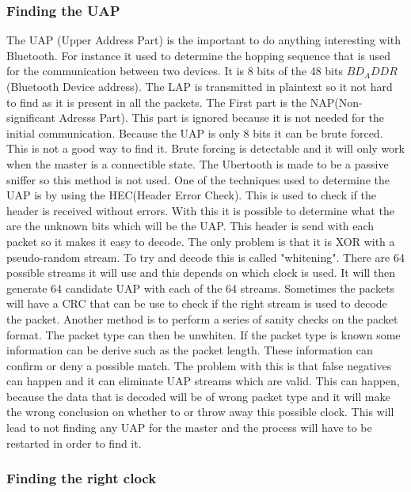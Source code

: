 \subsubsection{Finding the UAP}
The UAP (Upper Address Part) is the important to do anything interesting with Bluetooth. For instance it used to determine the hopping sequence that is used for the communication between two devices. It is 8 bits of the 48 bits $BD_ADDR$ (Bluetooth Device address). The LAP is transmitted in plaintext so it not hard to find as it is present in all the packets. The First part is the NAP(Non-significant Adresss Part). This part is ignored because it is not needed for the initial communication. Because the UAP is only 8 bits it can be brute forced. This is not a good way to find it. Brute forcing is detectable and it will only work when the master is a connectible state. 
The Ubertooth is made to be a passive sniffer so this method is not used. One of the techniques used to determine the UAP is by using the HEC(Header Error Check). This is used to check if the header is received without errors. With this it is possible to determine what the are the unknown bits which will be the UAP. This header is send with each packet so it makes it easy to decode. The only problem is that it is XOR with a pseudo-random stream. To try and decode this is called "whitening". There are 64 possible streams it will use and this depends on which clock is used. It will then generate 64 candidate UAP with each of the 64 streams. Sometimes the packets will have a CRC that can be use to check if the right stream is used to decode the packet.
Another method is to perform a series of sanity checks on the packet format. The packet type can then be unwhiten. If the packet type is known some information can be derive such as the packet length. These information can confirm or deny a possible match. The problem with this is that false negatives can happen and it can eliminate UAP streams which are valid. This can happen, because the data that is decoded will be of wrong packet type and it will make the wrong conclusion on whether to or throw away this possible clock. This will lead to not finding any UAP for the master and the process will have to be restarted in order to find it.

\subsubsection{Finding the right clock}
